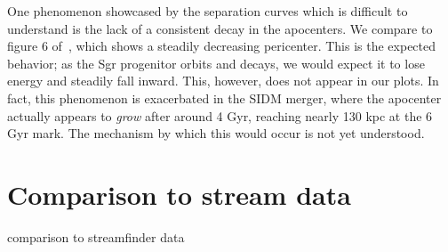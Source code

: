 One phenomenon showcased by the separation curves which is difficult to
understand is the lack of a consistent decay in the apocenters. We compare to
figure 6 of~\cite{dierickx_predicted_2017}, which shows a steadily decreasing
pericenter.  This is the expected behavior; as the Sgr progenitor orbits and
decays, we would expect it to lose energy and steadily fall inward.  This,
however, does not appear in our plots.  In fact, this phenomenon is
exacerbated in the SIDM merger, where the apocenter actually appears to
\textit{grow} after around 4 Gyr, reaching nearly 130 kpc at the 6 Gyr mark.
The mechanism by which this would occur is not yet understood.


\hypertarget{comparison-to-stream-data}{%
\section{Comparison to stream data}\label{comparison-to-stream-data}}

comparison to streamfinder data

